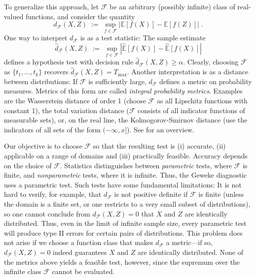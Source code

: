 \documentclass{article}
\begin{document}
To generalize this approach, let $\mathcal{F}$ be an arbitrary
(possibly infinite) class of real-valued functions, and consider the quantity
\begin{equation*}
  d_{\mathcal{F}}(X,Z)\;:=\;\sup_{f\in\mathcal{F}}|\mathbb{E}[f(X)]-\mathbb{E}[f(Z)]|\;.
\end{equation*}
One way to interpret $d_\mathcal{F}$ is as a test statistic: 
The sample estimate
\begin{equation}
  \hat{d}_\mathcal{F}(X,Z)\;:=\;
  \sup_{f\in\mathcal{F}}|\hat{\mathbb{E}}[f(X)]-\hat{\mathbb{E}}[f(X)]| \label{eq:naive-IPM}
\end{equation}
defines a hypothesis test with decision rule 
${\hat{d}_\mathcal{F}(X,Z)\geq\alpha}$. Clearly, choosing
$\mathcal{F}$ as ${\{t_1,\ldots,t_k\}}$ recovers ${\hat{d}_\mathcal{F}(X,Z)=T_{\text{max}}}$.
Another interpretation is as a distance between distributions:
If $\mathcal{F}$ is sufficiently large, $d_\mathcal{F}$ defines a
metric on probability measures. Metrics of this form are called
\emph{integral probability metrics}. Examples are the Wasserstein
distance of order 1 (choose $\mathcal{F}$ as all Lipschitz functions
with constant 1), the total variation distance ($\mathcal{F}$ consists
of all indicator functions of measurable sets), or, on the real line,
the Kolmogorov-Smirnov distance (use the indicators of
all sets of the form ${(-\infty,x]}$). See \cite{mueller:1997} for an overview.

Our objective is to choose $\mathcal{F}$ so that the resulting test is
(i) accurate, (ii) applicable on a range of
domains and (iii) practically feasible.
Accuracy depends on the choice of $\mathcal{F}$.
Statistics distinguishes between \emph{parametric} tests,
where $\mathcal{F}$ is finite, and \emph{nonparametric} tests, where it is
infinite. Thus, the Geweke diagnostic uses a parametric test.
Such tests have some fundamental limitations: It is not hard to
verify, for example, that $d_\mathcal{F}$ is not positive definite if
$\mathcal{F}$ is finite (unless the domain is a finite set, or one
restricts to a very small subset of distributions), so one cannot
conclude from ${d_\mathcal{F}(X,Z)=0}$ that $X$ and $Z$ are
identically distributed. Thus, even in the limit of infinite sample
size, every parametric test will produce type
II errors for certain pairs of distributions.
This problem does not arise if we choose a function class that makes
$d_{\mathcal{F}}$ a metric---if so,
${d_\mathcal{F}(X,Z)=0}$ indeed guarantees $X$ and $Z$ are identically
distributed.
None of the metrics above yields a feasible test, however, since
the supremum over the infinite class $\mathcal{F}$ cannot be evaluated.
\end{document}
